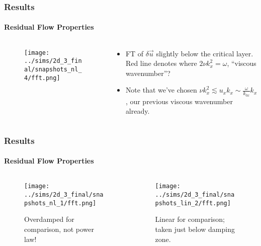 \documentclass[dvipsnames]{beamer}
\begin{document}
\begin{frame}
    \frametitle{Results}
    \framesubtitle{Residual Flow Properties}

    \begin{columns}
        \begin{column}{0.5\textwidth}
            \begin{figure}[t]
                \centering
                \texttt{[image: ../sims/2d\_3\_final/snapshots\_nl\_4/fft.png]}
            \end{figure}
        \end{column}
        \begin{column}{0.5\textwidth}
            \begin{itemize}
                \item FT of $\delta \vec{u}$ slightly below the critical layer.
                    Red line denotes where $2\nu k_x^2 = \omega$, ``viscous
                    wavenumber''?

                \item Note that we've chosen $\nu k_x^2 \lesssim u_xk_x \sim
                    \frac{\omega}{k_{0x}}k_x$, our previous viscous wavenumber
                    already.
            \end{itemize}
        \end{column}
    \end{columns}
\end{frame}

\begin{frame}
    \frametitle{Results}
    \framesubtitle{Residual Flow Properties}

    \begin{columns}
        \begin{column}{0.5\textwidth}
            \begin{figure}[t]
                \centering
                \texttt{[image: ../sims/2d\_3\_final/snapshots\_nl\_1/fft.png]}
                \caption{Overdamped for comparison, not power law!}
            \end{figure}
        \end{column}
        \begin{column}{0.5\textwidth}
            \begin{figure}[t]
                \centering
                \texttt{[image: ../sims/2d\_3\_final/snapshots\_lin\_2/fft.png]}
                \caption{Linear for comparison; taken just below damping zone.}
            \end{figure}
        \end{column}
    \end{columns}
\end{frame}
\end{document}
